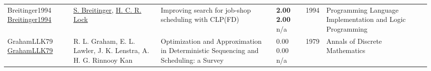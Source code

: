 {\begin{longtable}{p{3cm}p{5cm}p{10cm}p{1cm}rp{2.5cm}l}
Breitinger1994 \href{http://dx.doi.org/10.1007/3-540-58402-1_20}{Breitinger1994} & \hyperref[auth:a694]{S. Breitinger}, \hyperref[auth:a695]{H. C. R. Lock} & Improving search for job-shop scheduling with CLP(FD) & \noindent{}\textbf{2.00} \textbf{2.00} n/a & 1994 & Programming Language Implementation and Logic Programming & \cite{Breitinger1994}\\
GrahamLLK79 \href{http://dx.doi.org/10.1016/s0167-5060(08)70356-x}{GrahamLLK79} & R. L. Graham, E. L. Lawler, J. K. Lenstra, A. H. G. Rinnooy Kan & \cellcolor{green!10}Optimization and Approximation in Deterministic Sequencing and Scheduling: a Survey & \noindent{}\textcolor{black!50}{0.00} \textcolor{black!50}{0.00} n/a & 1979 & Annals of Discrete Mathematics & \cite{GrahamLLK79}\\
\end{longtable}
}

